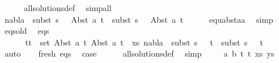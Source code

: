 \begin{isabellebody}
\ \ \ \ \isamarkupfalse%
\ all{\isacharunderscore}{\kern0pt}solutions{\isacharunderscore}{\kern0pt}def\ \isamarkupfalse%
\ simp{\isacharunderscore}{\kern0pt}all\isanewline
\ \ \isamarkupfalse%
\ {\isachardoublequoteopen}nabla{}\ {\isasymturnstile}\ subst\ {\isacharparenleft}{\kern0pt}s{}\ {\isasymbullet}\ {\isacharbrackleft}{\kern0pt}{\isacharbrackright}{\kern0pt}{\isacharparenright}{\kern0pt}\ {\isacharparenleft}{\kern0pt}Abst\ a\ t{}{\isacharparenright}{\kern0pt}\ {\isasymapprox}\ subst\ {\isacharparenleft}{\kern0pt}s{}\ {\isasymbullet}\ {\isacharbrackleft}{\kern0pt}{\isacharbrackright}{\kern0pt}{\isacharparenright}{\kern0pt}\ {\isacharparenleft}{\kern0pt}Abst\ a\ t{}{\isacharparenright}{\kern0pt}{\isachardoublequoteclose}\isanewline
\ \ \ \ \isamarkupfalse%
\ equ{\isacharunderscore}{\kern0pt}abst{\isacharunderscore}{\kern0pt}aa\ \isamarkupfalse%
\ simp\isanewline
\ \ \isamarkupfalse%
\ eqs{\isacharunderscore}{\kern0pt}old\ \isamarkupfalse%
\ eqs{\isacharcolon}{\kern0pt}\isanewline
\ \ \ \ \ {\isachardoublequoteopen}{\isasymforall}\ {\isacharparenleft}{\kern0pt}t{}{\isacharcomma}{\kern0pt}t{}{\isacharparenright}{\kern0pt}\ {\isasymin}\ set\ {\isacharparenleft}{\kern0pt}{\isacharparenleft}{\kern0pt}Abst\ a\ t{}{\isacharcomma}{\kern0pt}\ Abst\ a\ t{}{\isacharparenright}{\kern0pt}\ {\isacharhash}{\kern0pt}\ xs{\isacharparenright}{\kern0pt}{\isachardot}{\kern0pt}\ nabla{}\ {\isasymturnstile}\ subst\ {\isacharparenleft}{\kern0pt}s{}\ {\isasymbullet}\ {\isacharbrackleft}{\kern0pt}{\isacharbrackright}{\kern0pt}{\isacharparenright}{\kern0pt}\ t{}\ {\isasymapprox}\ subst\ {\isacharparenleft}{\kern0pt}s{}\ {\isasymbullet}\ {\isacharbrackleft}{\kern0pt}{\isacharbrackright}{\kern0pt}{\isacharparenright}{\kern0pt}\ t{}{\isachardoublequoteclose}\isanewline
\ \ \ \ \ \isamarkupfalse%
\ auto\isanewline
\ \ \isamarkupfalse%
\ fresh\ eqs\ \isamarkupfalse%
\ {\isacharquery}{\kern0pt}case\isanewline
\ \ \ \ \isamarkupfalse%
\ all{\isacharunderscore}{\kern0pt}solutions{\isacharunderscore}{\kern0pt}def\ \isamarkupfalse%
\ simp\isanewline
{}\isamarkupfalse%
\isanewline
\ \ \isamarkupfalse%
\ {\isacharparenleft}{\kern0pt}{}\ a\ b\ t{}\ t{}\ xs\ ys{\isacharparenright}{\kern0pt}\isanewline

\end{isabellebody}
